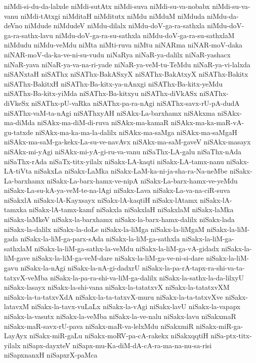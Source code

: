 {niMdi-si-du-da-lalxde
niMdi-sutAtx
niMdi-suva
niMdi-su-va-nobabx
niMdi-su-va-vanu
niMdi-tAtxgi
niMditaH
niMditutx
niMdu
niMduM
niMduda
niMdu-da-deVno
niMdude
niMdudeV
niMdu-dilalx
niMdu-doV-ga-ra-sathxla
niMdu-doV-ga-ra-sathx-lavu
niMdu-doV-ga-ra-su-sathxla
niMdu-doV-ga-ra-su-sathxlaM
niMdudu
niMdu-veMdu
niMta
niMti-ruva
niMtu
niNARma
niNAR-moV-daka
niNAR-moV-da-ka-ve-ni-su-vudu
niNaRya
niNaR-ya-dalilx
niNaR-yashacx
niNaR-yava
niNaR-ya-va-na-ri-yade
niNaR-ya-veM-tu-TeMdu
niNaR-ya-vi-lalxda
niSANxtaH
niSAThx
niSAThx-BakASxyX
niSAThx-BakAtxyX
niSAThx-Bakitx
niSAThx-BakitxH
niSAThx-Ba-kitx-ya-nAnxgi
niSAThx-Ba-kitx-yeMdu
niSAThx-Ba-kitx-yiMda
niSAThx-Ba-kitxyu
niSAThx-diVkASx
niSAThx-diVkeSx
niSAThx-pU-vaRka
niSAThx-pa-ra-nAgi
niSAThx-savx-rU-pA-dudA
niSAThx-vaM-ta-nAgi
niSAThxyAH
niSAkx-La-barxhamx
niSAkxma
niSAkx-ma-diMda
niSAkx-ma-diM-di-ruva
niSAkx-ma-kamaR
niSAkx-ma-ka-maR-vA-gu-tatxde
niSAkx-ma-ka-ma-la-dalilx
niSAkx-ma-saMga
niSAkx-ma-saMgaH
niSAkx-ma-saM-ga-kekx-La-su-ve-navAvx
niSAkx-ma-saM-gaveV
niSAkx-masayx
niSAkx-mi-yAgi
niSAkx-mi-yA-gi-ru-va-vanu
niSaThx-LA-galu
niSaThx-nAda
niSaThx-rAda
niSaTx-titx-yilalx
niSakx-LA-kaqti
niSakx-LA-tamx-nanu
niSakx-LA-tiVta
niSakxLa
niSakx-LaMka
niSakx-LaM-ka-ni-ja-sha-ra-Na-neMbe
niSakx-La-barxhamx
niSakx-La-barx-hamx-ve-nipA
niSakx-La-barx-hamx-ve-yeMdu
niSakx-La-su-kA-ya-veM-te-na-lAgi
niSakx-Lava
niSakx-La-va-na-ciR-suva
niSakxlA
niSakx-lA-Kayxsayx
niSakx-lA-kaqtiH
niSakx-lAtamx
niSakx-lA-tamxka
niSakx-lA-tamx-kamf
niSakxla
niSakxlaH
niSakxlaM
niSakx-laMka
niSakx-laMkeV
niSakx-la-barxhamx
niSakx-la-barx-hamx-dalilx
niSakx-lada
niSakx-la-dalilx
niSakx-la-doLe
niSakx-la-liMga
niSakx-la-liMgaM
niSakx-la-liM-gada
niSakx-la-liM-ga-parx-sAda
niSakx-la-liM-ga-sathxla
niSakx-la-liM-ga-sathxlaM
niSakx-la-liM-ga-sathx-la-veMdu
niSakx-la-liM-ga-vA-gidadx
niSakx-la-liM-gave
niSakx-la-liM-ga-veM-dare
niSakx-la-liM-ga-ve-ni-si-dare
niSakx-la-liM-gavu
niSakx-la-nAgi
niSakx-la-nA-gi-dadxrU
niSakx-la-pa-rA-tapx-ra-shi-va-ta-tatxvX-veMba
niSakx-la-pa-ra-shi-va-liM-ga-dalilx
niSakx-la-sathx-la-da-lilxyU
niSakx-lasayx
niSakx-la-shi-vana
niSakx-la-tatatxvX
niSakx-la-tatatxvXM
niSakx-la-ta-tatxvXdA
niSakx-la-ta-tatxvX-muru
niSakx-la-ta-tatxvXve
niSakx-latavxM
niSakx-la-tavx-vuLaLx
niSakx-la-vAgi
niSakx-lavU
niSakx-la-vapapx
niSakx-la-vasutx
niSakx-la-veMba
niSakx-la-ve-nalu
niSakx-lavu
niSakxmaR
niSakx-maR-savx-rU-pava
niSakx-maR-va-lelxMdu
niSakxmiR
niSakx-miR-ga-LayAyx
niSakx-miR-gaLu
niSakx-moRV-pa-cA-rakekx
niSakxqqtiH
niSa-ptx-titx-yilalx
niSapx-dayxteV
niSapx-mu-Ka-diM-dA-cA-ra-ma-na-nu-sa-risi
niSapxnanxH
niSapxrX-paMca
}

